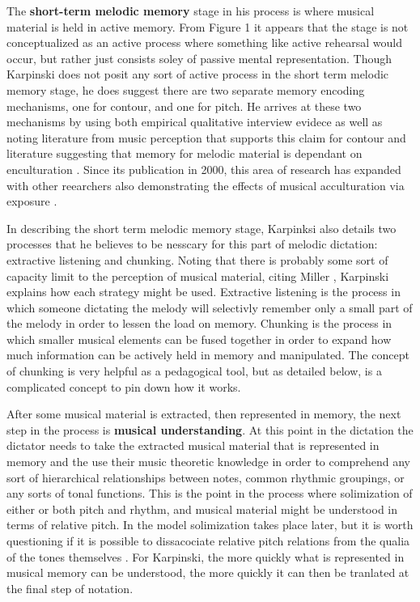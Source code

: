 \documentclass[]{book}
\begin{document}
The \textbf{short-term melodic memory} stage in his process is where musical material is held in active memory.
From Figure 1 it appears that the stage is not conceptualized as an active process where something like active rehearsal would occur, but rather just consists soley of passive mental representation.
Though Karpinski does not posit any sort of active process in the short term melodic memory stage, he does suggest there are two separate memory encoding mechanisms, one for contour, and one for pitch.
He arrives at these two mechanisms by using both empirical qualitative interview evidece as well as noting literature from music perception that supports this claim for contour \citep{dowlingScaleContourTwo1978, dewittRecognitionNovelMelodies1986} and literature suggesting that memory for melodic material is dependant on enculturation \citep{ouraMemoryMelodiesSubjects1988, handelListeningIntroductionPerception1989, dowlingExpectancyAttentionMelody1990}.
Since its publication in 2000, this area of research has expanded with other reearchers also demonstrating the effects of musical acculturation via exposure \citep{eerolaExpectancySamiYoiks2009, stevensMusicPerceptionCognition2012, pearceAuditoryExpectationInformation2012}.

In describing the short term melodic memory stage, Karpinksi also details two processes that he believes to be nesscary for this part of melodic dictation: extractive listening and chunking.
Noting that there is probably some sort of capacity limit to the perception of musical material, citing Miller \citeyearpar{millerMagicalNumberSeven1956}, Karpinski explains how each strategy might be used.
Extractive listening is the process in which someone dictating the melody will selectivly remember only a small part of the melody in order to lessen the load on memory.
Chunking is the process in which smaller musical elements can be fused together in order to expand how much information can be actively held in memory and manipulated.
The concept of chunking is very helpful as a pedagogical tool, but as detailed below, is a complicated concept to pin down how it works.

After some musical material is extracted, then represented in memory, the next step in the process is \textbf{musical understanding}.
At this point in the dictation the dictator needs to take the extracted musical material that is represented in memory and the use their music theoretic knowledge in order to comprehend any sort of hierarchical relationships between notes, common rhythmic groupings, or any sorts of tonal functions.
This is the point in the process where solimization of either or both pitch and rhythm, and musical material might be understood in terms of relative pitch.
In the model solimization takes place later, but it is worth questioning if it is possible to dissacociate relative pitch relations from the qualia of the tones themselves \citep{arthurPerceptualStudyScaledegree2018}.
For Karpinski, the more quickly what is represented in musical memory can be understood, the more quickly it can then be tranlated at the final step of notation.
\end{document}
